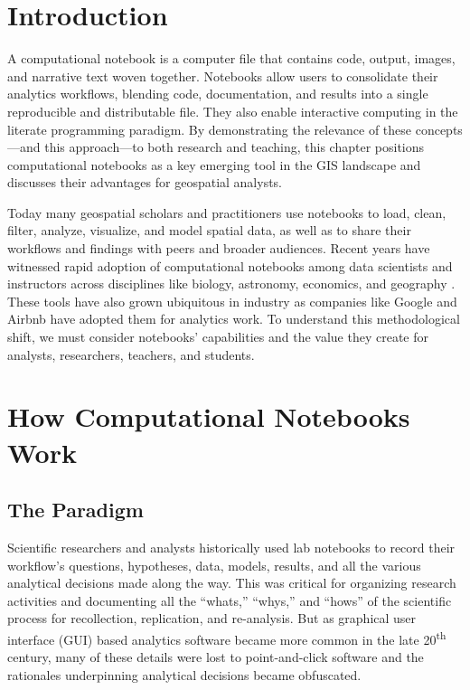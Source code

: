 \documentclass[11pt,letterpaper]{article}
\begin{document}
\section{Introduction}

A computational notebook is a computer file that contains code, output, images, and narrative text woven together. Notebooks allow users to consolidate their analytics workflows, blending code, documentation, and results into a single reproducible and distributable file. They also enable interactive computing in the literate programming paradigm. By demonstrating the relevance of these concepts---and this approach---to both research and teaching, this chapter positions computational notebooks as a key emerging tool in the GIS landscape and discusses their advantages for geospatial analysts.

Today many geospatial scholars and practitioners use notebooks to load, clean, filter, analyze, visualize, and model spatial data, as well as to share their workflows and findings with peers and broader audiences. Recent years have witnessed rapid adoption of computational notebooks among data scientists and instructors across disciplines like biology, astronomy, economics, and geography \citep{perkel_why_2018}. These tools have also grown ubiquitous in industry as companies like Google and Airbnb have adopted them for analytics work. To understand this methodological shift, we must consider notebooks' capabilities and the value they create for analysts, researchers, teachers, and students.

\section{How Computational Notebooks Work}

\subsection{The Paradigm}

Scientific researchers and analysts historically used lab notebooks to record their workflow's questions, hypotheses, data, models, results, and all the various analytical decisions made along the way. This was critical for organizing research activities and documenting all the \enquote{whats,} \enquote{whys,} and \enquote{hows} of the scientific process for recollection, replication, and re-analysis. But as graphical user interface (GUI) based analytics software became more common in the late 20\textsuperscript{th} century, many of these details were lost to point-and-click software and the rationales underpinning analytical decisions became obfuscated.
\end{document}
